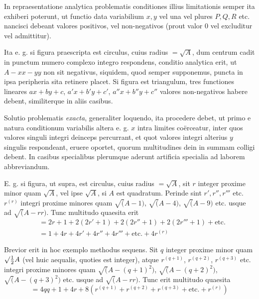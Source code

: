 In repraesentatione analytica problematis conditiones illius limitationis semper ita exhiberi poterunt, ut functio data variabilium $x,y$ vel una vel plures $P,Q,R$ etc. nancisci debeant valores positivos, vel non-negativos (prout valor $0$ vel excluditur vel admittitur).

Ita e. g. si figura praescripta est circulus, cuius radius $=\surd A$, dum centrum cadit in punctum numero complexo integro respondens, conditio analytica erit, ut $A-xx-yy$ non sit negativus, siquidem, quod semper supponemus, puncta in ipsa peripheria sita retinere placet. Si figura est triangulum, tres functiones lineares $ax+by+c$, $a'x+b'y+c'$, $a''x+b''y+c''$ valores non-negativos habere debent, similiterque in aliis casibus.

Solutio problematis \emph{exacta}, generaliter loquendo, ita procedere debet, ut primo e natura conditionum variabilis altera e. g. $x$ intra limites coërceatur, inter quos valores singuli integri deinceps percurrant, et quot valores integri alterius $y$ singulis respondeant, eruere oportet, quorum multitudines dein in summam colligi debent. In casibus specialibus plerumque aderunt artificia specialia ad laborem abbreviandum.

E. g. si figura, ut supra, est circulus, cuius radius $=\surd A$, sit $r$ integer proxime minor quam $\surd A$, vel ipse $\surd A$, si $A$ est quadratum. Perinde sint $r',r'',r'''$ etc. $r^{(r)}$ integri proxime minores quam $\surd(A-1)$, $\surd(A-4)$, $\surd(A-9)$ etc. usque ad $\surd(A-rr)$. Tunc multitudo quaesita erit
\[
\begin{aligned}
&=2r+1+2(2r'+1)+2(2r''+1)+2(2r'''+1)+\text{etc.}\\
&=1+4r+4r'+4r''+4r'''+\text{etc.}+4r^{(r)}
\end{aligned}
\]

Brevior erit in hoc exemplo methodus sequens. Sit $q$ integer proxime minor quam $\surd\tfrac12 A$ (vel huic aequalis, quoties est integer), atque $r^{(q+1)}$, $r^{(q+2)}$, $r^{(q+3)}$ etc. integri proxime minores quam $\surd(A-(q+1)^2)$, $\surd(A-(q+2)^2)$, $\surd(A-(q+3)^2)$ etc. usque ad $\surd(A-rr)$. Tunc erit multitudo quaesita
\[
=4qq+1+4r+8(r^{(q+1)}+r^{(q+2)}+r^{(q+3)}+\text{etc.}+r^{(r)})
\]

